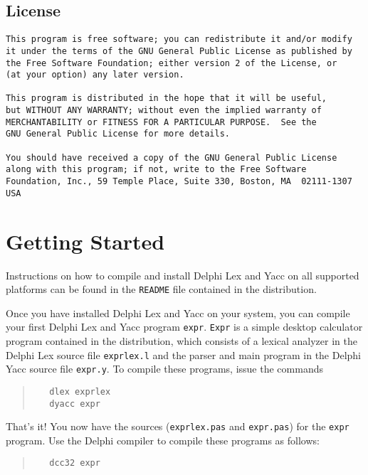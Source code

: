 \documentclass[a4paper]{article}
\begin{document}
\subsection{License}
\begin{verbatim}
This program is free software; you can redistribute it and/or modify
it under the terms of the GNU General Public License as published by
the Free Software Foundation; either version 2 of the License, or
(at your option) any later version.

This program is distributed in the hope that it will be useful,
but WITHOUT ANY WARRANTY; without even the implied warranty of
MERCHANTABILITY or FITNESS FOR A PARTICULAR PURPOSE.  See the
GNU General Public License for more details.

You should have received a copy of the GNU General Public License
along with this program; if not, write to the Free Software
Foundation, Inc., 59 Temple Place, Suite 330, Boston, MA  02111-1307  USA
\end{verbatim}

\newpage

\section{Getting Started}

Instructions on how to compile and install Delphi Lex and Yacc on all supported
platforms can be found in the \verb"README" file contained in the
distribution.

Once you have installed Delphi Lex and Yacc on your system, you can compile your
first Delphi Lex and Yacc program \verb"expr". \verb"Expr" is a simple desktop
calculator program contained in the distribution, which consists of a lexical
analyzer in the Delphi Lex source file \verb"exprlex.l" and the parser and main
program in the Delphi Yacc source file \verb"expr.y". To compile these programs,
issue the commands
\begin{quote}\begin{verbatim}
   dlex exprlex
   dyacc expr
\end{verbatim}\end{quote}
That's it! You now have the sources (\verb"exprlex.pas" and
\verb"expr.pas") for the \verb"expr" program. Use the Delphi
compiler to compile these programs as follows:
\begin{quote}\begin{verbatim}
   dcc32 expr
\end{verbatim}\end{quote}
\end{document}
